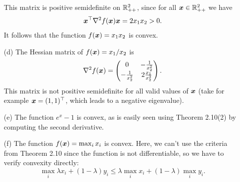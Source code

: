 \documentclass{article}
\begin{document}
\begin{itemize}
This matrix is positive semidefinite on $\mathbb{R}^2_{++}$, since for all $\bm{x}\in \mathbb{R}^2_{++}$ we have
\begin{equation*}
 \bm{x}^{\top}\nabla^2f(\bm{x})\bm{x} = 2x_1x_2>0.
\end{equation*}
It follows that the function $f(\bm{x})=x_1x_2$ is convex.
\item[(d)] The Hessian matrix of $f(\bm{x})=x_1/x_2$ is 
\begin{equation*}
 \nabla^2f(\bm{x}) = \begin{pmatrix}
                       0 & -\frac{1}{x_2^2}\\
                       -\frac{1}{x_2^2} & 2\frac{x_1}{x_2^3}
                      \end{pmatrix}.
\end{equation*}
This matrix is not positive semidefinite for all valid values of $\bm{x}$ (take for example $\bm{x}=(1,1)^{\top}$, which leads to a negative eigenvalue).
\item[(e)] The function $e^x-1$ is convex, as is easily seen using Theorem 2.10(2) by computing the second derivative.
\item[(f)] The function $f(\bm{x})=\max_i x_i$ is convex. Here, we can't use the criteria from Theorem 2.10 since the function is not differentiable, so we have to verify convexity directly:
\begin{equation*}
 \max_i \lambda x_i+(1-\lambda)y_i \leq \lambda \max_i x_i+(1-\lambda) \max_i y_i.
\end{equation*}
 \end{itemize}
\end{document}
